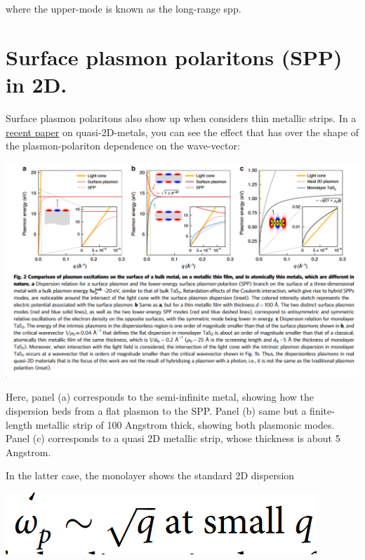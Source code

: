 \documentclass[11pt]{article}
\begin{document}
where the upper-mode is known as the long-range spp.



\section{Surface plasmon polaritons (SPP) in 2D.}
\label{sec:org0de3c7a}


Surface plasmon polaritons also show up when considers thin metallic
strips. In a \href{./s41467-020-14826-8.pdf}{recent paper} on quasi-2D-metals, you can see the effect
that has over the shape of the plasmon-polariton dependence on the
wave-vector:


\begin{center}
\includegraphics[width=.9\linewidth]{./Surface_plasmon_polaritons_(SPP)_in_2D/2023-08-28_10-34-02_screenshot.png}
\end{center}

Here, panel (a) corresponds to the semi-infinite metal, showing how
the dispersion beds from a flat plasmon to the SPP. Panel (b) same but
a finite-length metallic strip of 100 Angstrom thick, showing both
plasmonic modes. Panel (c) corresponds to a quasi 2D metallic strip,
whose thickness is about 5 Angstrom.

In the latter case, the monolayer shows the standard 2D dispersion

\begin{center}
\includegraphics[width=.9\linewidth]{./Surface_plasmon_polaritons_(SPP)_in_2D/2023-08-28_17-43-03_screenshot.png}
\end{center}
\end{document}
